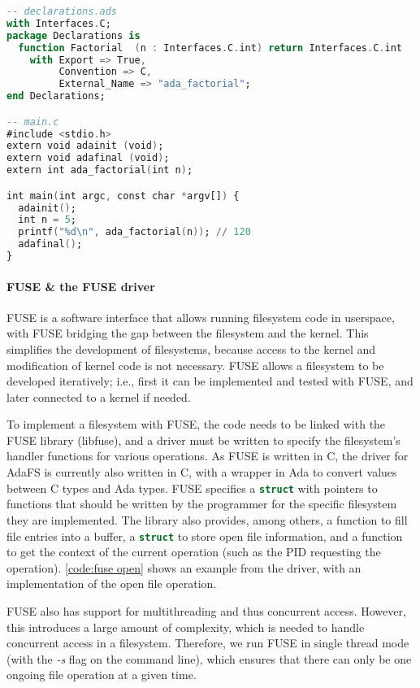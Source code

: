 \begin{lstlisting}[float=tb,caption={Interfacing code written in C and Ada. \textnormal{declarations.adb} is omitted for brevity, but is assumed to contain an implementation of the factorial function conforming to the specification.}, label={code:interfacing c and ada}, language=Ada, alsolanguage=C]
-- declarations.ads
with Interfaces.C;
package Declarations is
  function Factorial  (n : Interfaces.C.int) return Interfaces.C.int
    with Export => True,
         Convention => C,
         External_Name => "ada_factorial";
end Declarations;

-- main.c
#include <stdio.h>
extern void adainit (void);
extern void adafinal (void);
extern int ada_factorial(int n);

int main(int argc, const char *argv[]) {
  adainit();
  int n = 5;
  printf("%d\n", ada_factorial(n)); // 120
  adafinal();
}
\end{lstlisting}

\paragraph{FUSE \& the FUSE driver}
FUSE is a software interface that allows running filesystem code in userspace, with FUSE bridging the gap between the filesystem and the kernel.
This simplifies the development of filesystems, because access to the kernel and modification of kernel code is not necessary.
FUSE allows a filesystem to be developed iteratively; i.e., first it can be implemented and tested with FUSE, and later connected to a kernel if needed.

To implement a filesystem with FUSE, the code needs to be linked with the FUSE library (libfuse), and a driver must be written to specify the filesystem's handler functions for various operations.
As FUSE is written in C, the driver for AdaFS is currently also written in C, with a wrapper in Ada to convert values between C types and Ada types.
FUSE specifies a \lstinline[language=C]{struct} with pointers to functions that should be written by the programmer for the specific filesystem they are implemented.
The library also provides, among others, a function to fill file entries into a buffer, a \lstinline[language=C]{struct} to store open file information, and a function to get the context of the current operation (such as the PID requesting the operation).
\autoref{code:fuse open} shows an example from the driver, with an implementation of the open file operation.

FUSE also has support for multithreading and thus concurrent access.
However, this introduces a large amount of complexity, which is needed to handle concurrent access in a filesystem.
Therefore, we run FUSE in single thread mode (with the \textit{-s} flag on the command line), which ensures that there can only be one ongoing file operation at a given time.

